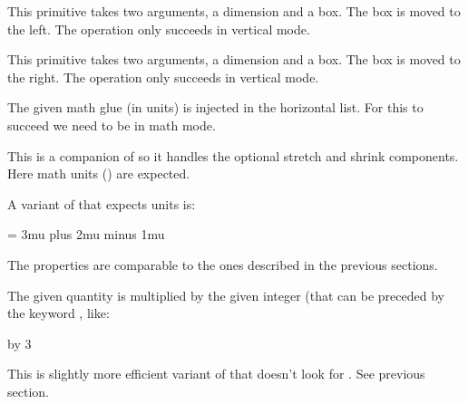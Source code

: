 \stopoldprimitive

\startoldprimitive[title={\prm {moveleft}}]

This primitive takes two arguments, a dimension and a box. The box is moved to
the left. The operation only succeeds in vertical mode.

\stopoldprimitive

\startoldprimitive[title={\prm {moveright}}]

This primitive takes two arguments, a dimension and a box. The box is moved to
the right. The operation only succeeds in vertical mode.

\stopoldprimitive

\startoldprimitive[title={\prm {mskip}}]

The given math glue (in  units) is injected in the horizontal list. For
this to succeed we need to be in math mode.

\stopoldprimitive

\startoldprimitive[title={\prm {muexpr}}]

This is a companion of  so it handles the optional stretch and
shrink components. Here math units () are expected.

\stopoldprimitive

\startnewprimitive[title={\prm {mugluespecdef}}]

A variant of  that expects  units is:

\starttyping
\mugluespecdef\MyGlue = 3mu plus 2mu minus 1mu
\stoptyping

The properties are comparable to the ones described in the previous sections.

\stopnewprimitive

\startoldprimitive[title={\prm {multiply}}]

The given quantity is multiplied by the given integer (that can be preceded by
the keyword , like:

\starttyping
\scratchdimen=10pt \multiply\scratchdimen by 3
\stoptyping

\stopoldprimitive

\startnewprimitive[title={\prm {multiplyby}}]

This is slightly more efficient variant of  that doesn't look for
. See previous section.

\stopnewprimitive

\startoldprimitive[title={\prm {muskip}}]

